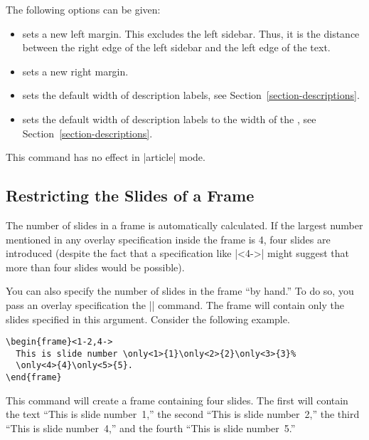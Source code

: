 \begin{command}{\setbeamermargin{}}
  The following options can be given:
  \begin{itemize}
  \item
     sets a new left
    margin. This excludes the left sidebar. Thus, it is the distance
    between the right edge of the left sidebar and the left edge of
    the text.
  \item
     sets a new right
    margin.
  \item
     sets the
    default width of description labels, see
    Section~\ref{section-descriptions}. 
  \item
     sets the
    default width of description labels to the width of the
    , see  Section~\ref{section-descriptions}. 
  \end{itemize}

  \articlenote
  This command has no effect in |article| mode.
\end{command}




\subsection{Restricting the Slides of a Frame}
\label{section-restriction}

The number of slides in a frame is automatically
calculated. If the largest number mentioned in any
overlay specification inside the frame is 4, four slides are
introduced (despite the fact that a specification like |<4->|
might suggest that more than four slides would be possible).

You can also specify the number of slides in the frame ``by hand.'' To
do so, you pass an overlay specification the |\frame| command. The
frame will contain only the slides specified in this
argument. Consider the following example. 

\begin{verbatim}
\begin{frame}<1-2,4->
  This is slide number \only<1>{1}\only<2>{2}\only<3>{3}%
  \only<4>{4}\only<5>{5}.
\end{frame}
\end{verbatim}
This command will create a frame containing four slides. The first
will contain the text ``This is slide number~1,'' the second ``This is
slide number~2,'' the third ``This is slide number~4,'' and the fourth
``This is slide number~5.''


